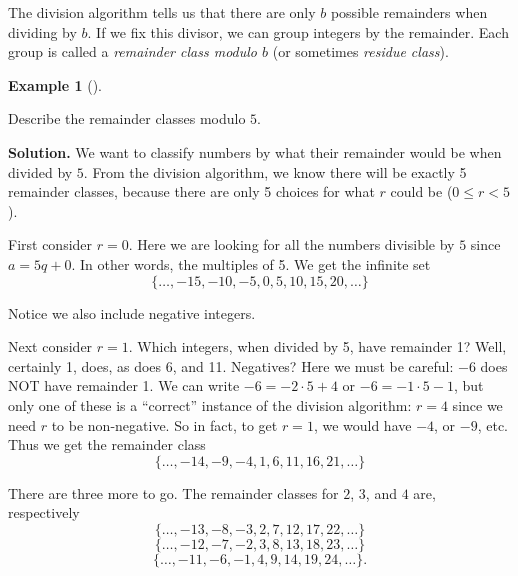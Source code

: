 \documentclass[10pt,]{book}
\theoremstyle{plain}
\theoremstyle{definition}
\newtheorem{example}[theorem]{Example}
\theoremstyle{definition}
\theoremstyle{definition}
\numberwithin{equation}{chapter}
\newcommand{\lt}{ < }
\begin{document}
The division algorithm tells us that there are only \(b\) possible remainders when dividing by \(b\). If we fix this divisor, we can group integers by the remainder. Each group is called a \emph{remainder class modulo \(b\)} (or sometimes \emph{residue class}).
%
\begin{example}[]\label{example-116}

Describe the remainder classes modulo \(5\).
%
\par\medskip\noindent%
\textbf{Solution.}\quad
We want to classify numbers by what their remainder would be when divided by \(5\). From the division algorithm, we know there will be exactly 5 remainder classes, because there are only 5 choices for what \(r\) could be (\(0 \le r \lt  5\)).
%
\par

First consider \(r = 0\). Here we are looking for all the numbers divisible by \(5\) since \(a = 5q+0\). In other words, the multiples of 5. We get the infinite set
\begin{equation*}
  \{\ldots, -15, -10, -5, 0, 5, 10, 15, 20, \ldots\}
\end{equation*}
%
\par

Notice we also include negative integers.
%
\par

Next consider \(r = 1\). Which integers, when divided by 5, have remainder 1? Well, certainly 1, does, as does 6, and 11. Negatives? Here we must be careful: \(-6\) does NOT have remainder 1. We can write \(-6 = -2\cdot 5 + 4\) or \(-6 = -1 \cdot 5 - 1\), but only one of these is a ``correct'' instance of the division algorithm: \(r = 4\) since we need \(r\) to be non-negative. So in fact, to get \(r = 1\), we would have \(-4\), or \(-9\), etc. Thus we get the remainder class
\begin{equation*}
  \{\ldots, -14, -9, -4, 1, 6, 11, 16, 21, \ldots\}
\end{equation*}
%
\par

There are three more to go. The remainder classes for \(2\), \(3\), and \(4\) are, respectively
\begin{equation*}
  \{\ldots, -13, -8, -3, 2, 7, 12, 17, 22,\ldots\}
\end{equation*}
%
\begin{equation*}
  \{\ldots, -12, -7, -2, 3, 8, 13, 18, 23, \ldots\}
\end{equation*}\begin{equation*}
  \{\ldots, -11, -6, -1, 4, 9, 14, 19, 24, \ldots\}.
\end{equation*}\end{example}
\par
\end{document}
